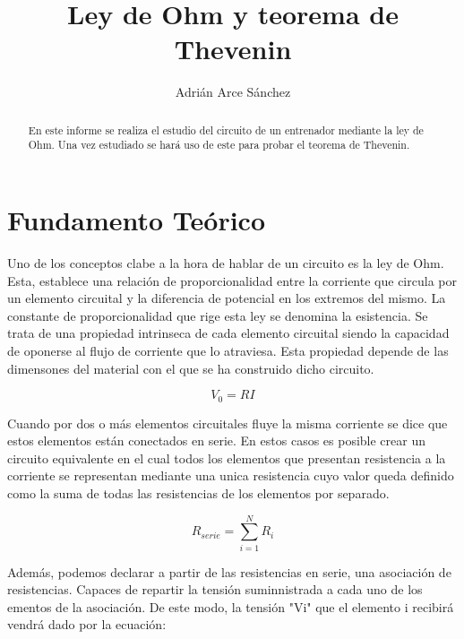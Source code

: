 \documentclass[a4paper,11pt]{article}
\begin{document}
\begin{titlepage}
\title{Ley de Ohm y teorema de Thevenin}
\author{Adrián Arce Sánchez}
\maketitle
\end{titlepage}

\begin{abstract}

En este informe se realiza el estudio del circuito de un entrenador mediante la ley de Ohm. Una vez estudiado se hará uso de este para probar el teorema de Thevenin.
\end{abstract}

\section{Fundamento Teórico}
Uno de los conceptos clabe a la hora de hablar de un circuito es la ley de Ohm. Esta, establece una relación de proporcionalidad entre la corriente que circula por un elemento circuital y la diferencia de potencial en los extremos del mismo. La constante de proporcionalidad que rige esta ley se denomina la esistencia. Se trata de una propiedad intrinseca de cada elemento circuital siendo la capacidad de oponerse al flujo de corriente que lo atraviesa. Esta propiedad depende de las dimensones del material con el que se ha construido dicho circuito.

\begin{displaymath}
V_{0}=RI
\end{displaymath}

Cuando por dos o más elementos circuitales fluye la misma corriente se dice que estos elementos están conectados en serie. En estos casos es posible crear un circuito equivalente en el cual todos los elementos que presentan resistencia a la corriente se representan mediante una unica resistencia cuyo valor queda definido como la suma de todas las resistencias de los elementos por separado.

\begin{displaymath}
R_{serie}=\sum_{i=1}^N R_{i}
\end{displaymath}

Además, podemos declarar a partir de las resistencias en serie, una asociación de resistencias. Capaces de repartir la tensión suminnistrada a cada uno de los ementos de la asociación. De este modo, la tensión "Vi" que el elemento i recibirá vendrá dado por la ecuación:
\end{document}
